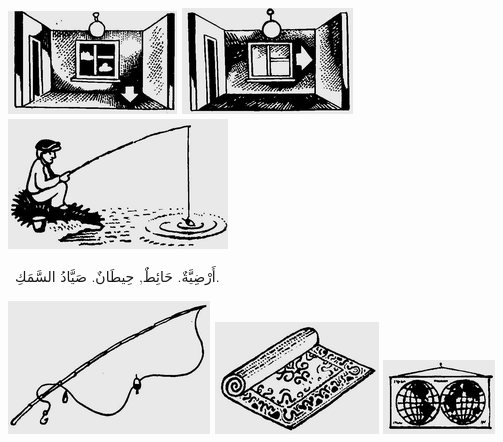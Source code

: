 \documentclass[a5paper]{article}
\begin{document}
 \includegraphics[width=1.7602in,height=1.0728in]{images/MuhammadBagauddinprettified-img090.png}   \includegraphics[width=1.7811in,height=1.1043in]{images/MuhammadBagauddinprettified-img091.png}   \includegraphics[width=2.2917in,height=1.3543in]{images/MuhammadBagauddinprettified-img092.png} 

\ أَرْضِيَّةٌ. حَائِطٌ, حِيطَانٌ. صَيَّادُ السَّمَكِ. 

 \includegraphics[width=2.1043in,height=1.3854in]{images/MuhammadBagauddinprettified-img093.png}   \includegraphics[width=1.7083in,height=1.1665in]{images/MuhammadBagauddinprettified-img094.png}   \includegraphics[width=1.1665in,height=0.7709in]{images/MuhammadBagauddinprettified-img095.png} 
\end{document}
